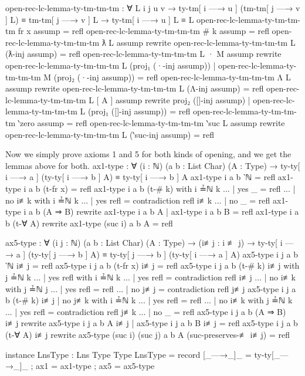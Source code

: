 \documentclass[logo,bsc,singlespacing,parskip,online]{infthesis}
\renewenvironment{code}{\mintedcopy[breaklines,breaksymbolleft=\;]{agda}}{\endmintedcopy}
\begin{document}
\begin{code}
  open-rec-lc-lemma-ty-tm-tm-tm : ∀ {L i j u v}
    → ty-tm[ i —→ u ] (tm-tm[ j —→ v ] L) ≡ tm-tm[ j —→ v ] L
    → ty-tm[ i —→ u ] L ≡ L
  open-rec-lc-lemma-ty-tm-tm-tm {fr x} assump = refl
  open-rec-lc-lemma-ty-tm-tm-tm {# k} assump = refl
  open-rec-lc-lemma-ty-tm-tm-tm {ƛ L} assump rewrite
    open-rec-lc-lemma-ty-tm-tm-tm {L} (ƛ-inj assump) = refl
  open-rec-lc-lemma-ty-tm-tm-tm {L · M} assump rewrite
      open-rec-lc-lemma-ty-tm-tm-tm {L} (proj₁ (·-inj assump))
    | open-rec-lc-lemma-ty-tm-tm-tm {M} (proj₂ (·-inj assump))
    = refl
  open-rec-lc-lemma-ty-tm-tm-tm {Λ L} assump rewrite
    open-rec-lc-lemma-ty-tm-tm-tm {L} (Λ-inj assump) = refl
  open-rec-lc-lemma-ty-tm-tm-tm {L [ A ]} assump rewrite
      proj₂ ([]-inj assump)
    | open-rec-lc-lemma-ty-tm-tm-tm {L} (proj₁ ([]-inj assump))
    = refl
  open-rec-lc-lemma-ty-tm-tm-tm {‵zero} assump = refl
  open-rec-lc-lemma-ty-tm-tm-tm {‵suc L} assump rewrite
    open-rec-lc-lemma-ty-tm-tm-tm {L} (‵suc-inj assump) = refl
\end{code}

Now we simply prove axioms 1 and 5 for both kinds of opening, and we get the lemmas above for both.
\begin{code}
  ax1-type : ∀ (i : ℕ) (a b : List Char) (A : Type)
    → ty-ty[ i —→ a ] (ty-ty[ i —→ b ] A) ≡ ty-ty[ i —→ b ] A
  ax1-type i a b ‵ℕ = refl
  ax1-type i a b (t-fr x) = refl
  ax1-type i a b (t-# k) with i ≟ℕ k
  ... | yes _   = refl
  ... | no  i≢k with i ≟ℕ k
  ... | yes refl = contradiction refl i≢k
  ... | no  _    = refl
  ax1-type i a b (A ⇒ B)
    rewrite ax1-type i a b A | ax1-type i a b B = refl
  ax1-type i a b (t-∀ A) rewrite ax1-type (suc i) a b A = refl

  ax5-type : ∀ (i j : ℕ) (a b : List Char) (A : Type)
    → (i≢j : i ≢ j)
    → ty-ty[ i —→ a ] (ty-ty[ j —→ b ] A)
      ≡ ty-ty[ j —→ b ] (ty-ty[ i —→ a ] A)
  ax5-type i j a b ‵ℕ i≢j = refl
  ax5-type i j a b (t-fr x) i≢j = refl
  ax5-type i j a b (t-# k) i≢j with j ≟ℕ k
  ... | yes refl with i ≟ℕ k
  ... |   yes refl = contradiction refl i≢j
  ... |   no  i≢k  with j ≟ℕ j
  ... |     yes refl = refl
  ... |     no  j≢j  = contradiction refl j≢j
  ax5-type i j a b (t-# k) i≢j | no j≢k with i ≟ℕ k
  ... | yes refl = refl
  ... | no  i≢k  with j ≟ℕ k
  ... |   yes refl = contradiction refl j≢k
  ... |   no  _    = refl
  ax5-type i j a b (A ⇒ B) i≢j
    rewrite ax5-type i j a b A i≢j | ax5-type i j a b B i≢j = refl
  ax5-type i j a b (t-∀ A) i≢j
    rewrite ax5-type (suc i) (suc j) a b A (suc-preserves-≢ i≢j)
          = refl

  instance
    LnsType : Lns Type Type
    LnsType = record
      { [_—→_]_ = ty-ty[_—→_]_
      ; ax1 = ax1-type
      ; ax5 = ax5-type }
\end{code}
\end{document}
